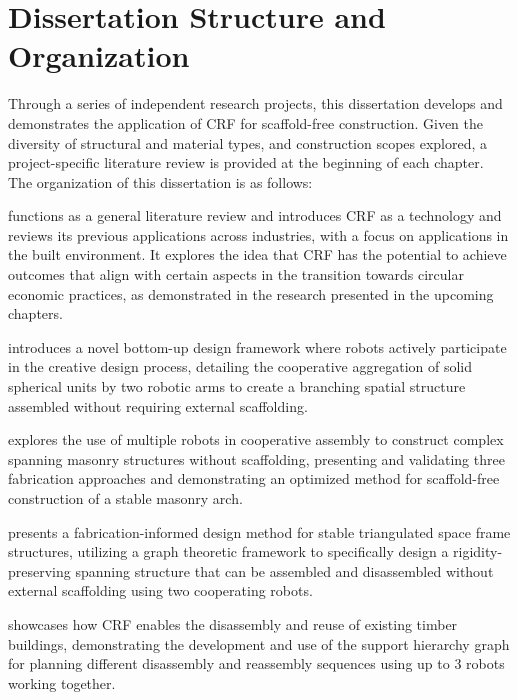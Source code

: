 \section{Dissertation Structure and Organization}
    Through a series of independent research projects, this dissertation develops and demonstrates the application of CRF for scaffold-free construction. Given the diversity of structural and material types, and construction scopes explored, a project-specific literature review is provided at the beginning of each chapter. The organization of this dissertation is as follows:
    
     functions as a general literature review and introduces CRF as a technology and reviews its previous applications across industries, with a focus on applications in the built environment. It explores the idea that CRF has the potential to achieve outcomes that align with certain aspects in the transition towards circular economic practices, as demonstrated in the research presented in the upcoming chapters.
    
     introduces a novel bottom-up design framework where robots actively participate in the creative design process, detailing the cooperative aggregation of solid spherical units by two robotic arms to create a branching spatial structure assembled without requiring external scaffolding.
    
     explores the use of multiple robots in cooperative assembly to construct complex spanning masonry structures without scaffolding, presenting and validating three fabrication approaches and demonstrating an optimized method for scaffold-free construction of a stable masonry arch.
    
     presents a fabrication-informed design method for stable  triangulated space frame structures, utilizing a graph theoretic framework to specifically design a rigidity-preserving spanning structure that can be assembled and disassembled without external scaffolding using two cooperating robots.
    
     showcases how CRF enables the disassembly and reuse of existing timber buildings, demonstrating the development and use of the support hierarchy graph for planning different disassembly and reassembly sequences using up to 3 robots working together.
    
